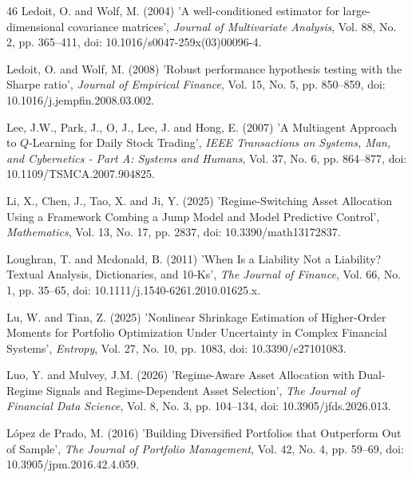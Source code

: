 \begin{thebibliography}{46}
Ledoit, O. and Wolf, M. (2004) 'A well-conditioned estimator for large-dimensional covariance matrices', {\it Journal of Multivariate Analysis}, Vol. 88, No. 2, pp. 365--411, doi: 10.1016/s0047-259x(03)00096-4.

Ledoit, O. and Wolf, M. (2008) 'Robust performance hypothesis testing with the Sharpe ratio', {\it Journal of Empirical Finance}, Vol. 15, No. 5, pp. 850--859, doi: 10.1016/j.jempfin.2008.03.002.

Lee, J.W., Park, J., O, J., Lee, J. and Hong, E. (2007) 'A Multiagent Approach to $Q$-Learning for Daily Stock Trading', {\it IEEE Transactions on Systems, Man, and Cybernetics - Part A: Systems and Humans}, Vol. 37, No. 6, pp. 864--877, doi: 10.1109/TSMCA.2007.904825.

Li, X., Chen, J., Tao, X. and Ji, Y. (2025) 'Regime-Switching Asset Allocation Using a Framework Combing a Jump Model and Model Predictive Control', {\it Mathematics}, Vol. 13, No. 17, pp. 2837, doi: 10.3390/math13172837.

Loughran, T. and Mcdonald, B. (2011) 'When Is a Liability Not a Liability? Textual Analysis, Dictionaries, and 10‐Ks', {\it The Journal of Finance}, Vol. 66, No. 1, pp. 35--65, doi: 10.1111/j.1540-6261.2010.01625.x.

Lu, W. and Tian, Z. (2025) 'Nonlinear Shrinkage Estimation of Higher-Order Moments for Portfolio Optimization Under Uncertainty in Complex Financial Systems', {\it Entropy}, Vol. 27, No. 10, pp. 1083, doi: 10.3390/e27101083.

Luo, Y. and Mulvey, J.M. (2026) 'Regime-Aware Asset Allocation with Dual-Regime Signals and Regime-Dependent Asset Selection', {\it The Journal of Financial Data Science}, Vol. 8, No. 3, pp. 104--134, doi: 10.3905/jfds.2026.013.

López de Prado, M. (2016) 'Building Diversified Portfolios that Outperform Out of Sample', {\it The Journal of Portfolio Management}, Vol. 42, No. 4, pp. 59--69, doi: 10.3905/jpm.2016.42.4.059.


\end{thebibliography}
